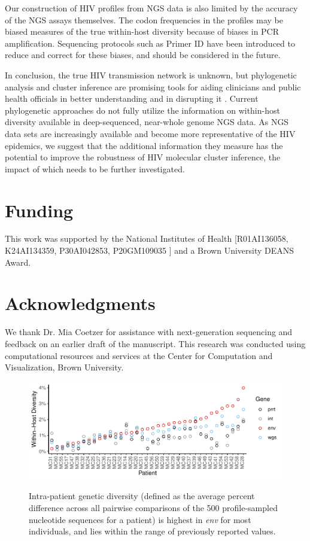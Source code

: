 \documentclass[letterpaper]{article}
\begin{document}
Our construction of HIV profiles from NGS data is also limited by the accuracy of the NGS assays themselves. The codon frequencies in the profiles may be biased measures of the true within-host diversity because of biases in PCR amplification. Sequencing protocols such as Primer ID \parencite{jabara} have been introduced to reduce and correct for these biases, and should be considered in the future.

In conclusion, the true HIV transmission network is unknown, but phylogenetic analysis and cluster inference are promising tools for aiding clinicians and public health officials in better understanding and in disrupting it \parencite{fauci}. Current phylogenetic approaches do not fully utilize the information on within-host diversity available in deep-sequenced, near-whole genome NGS data. As NGS data sets are increasingly available and become more representative of the HIV epidemics, we suggest that the additional information they measure has the potential to improve the robustness of HIV molecular cluster inference, the impact of which needs to be further investigated.

\section*{Funding}

This work was supported by the National Institutes of Health [R01AI136058, K24AI134359, P30AI042853, P20GM109035 ] and a Brown University DEANS Award.

\section*{Acknowledgments}

We thank Dr. Mia Coetzer for assistance with next-generation sequencing and feedback on an earlier draft of the manuscript. This research was conducted using computational resources and services at the Center for Computation and Visualization, Brown University.

\printbibliography

\begin{figure}[p!]
	\caption{Intra-patient genetic diversity (defined as the average percent difference across all pairwise comparisons of the 500 profile-sampled nucleotide sequences for a patient) is highest in \emph{env} for most individuals, and lies within the range of previously reported values.}
	\centering
	\includegraphics[width=\linewidth]{Figure1}
	\label{fig1}
\end{figure}
\end{document}
